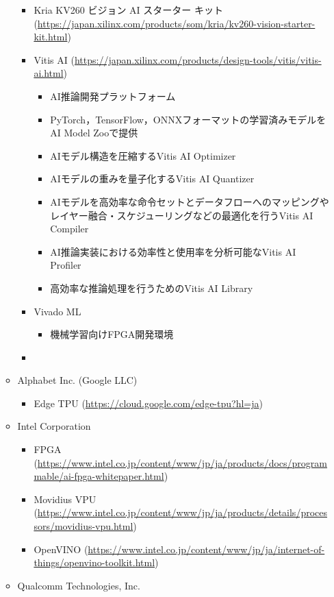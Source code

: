 \begin{itemize}
\begin{itemize}
\begin{itemize}
			\item Kria KV260 ビジョン AI スターター キット (\url{https://japan.xilinx.com/products/som/kria/kv260-vision-starter-kit.html})
			\item Vitis AI (\url{https://japan.xilinx.com/products/design-tools/vitis/vitis-ai.html})
			\begin{itemize}
				\item AI推論開発プラットフォーム
				\item PyTorch，TensorFlow，ONNXフォーマットの学習済みモデルをAI Model Zooで提供
				\item AIモデル構造を圧縮するVitis AI Optimizer
				\item AIモデルの重みを量子化するVitis AI Quantizer
				\item AIモデルを高効率な命令セットとデータフローへのマッピングやレイヤー融合・スケジューリングなどの最適化を行うVitis AI Compiler
				\item AI推論実装における効率性と使用率を分析可能なVitis AI Profiler
				\item 高効率な推論処理を行うためのVitis AI Library
			\end{itemize}
			\item Vivado ML
			\begin{itemize}
				\item 機械学習向けFPGA開発環境
			\end{itemize}
			\item 
		\end{itemize}
		\item Alphabet Inc. (Google LLC)
		\begin{itemize}
			\item Edge TPU (\url{https://cloud.google.com/edge-tpu?hl=ja})
		\end{itemize}
		\item Intel Corporation
		\begin{itemize}
			\item FPGA (\url{https://www.intel.co.jp/content/www/jp/ja/products/docs/programmable/ai-fpga-whitepaper.html})
			\item Movidius VPU (\url{https://www.intel.co.jp/content/www/jp/ja/products/details/processors/movidius-vpu.html})
			\item OpenVINO (\url{https://www.intel.co.jp/content/www/jp/ja/internet-of-things/openvino-toolkit.html})
		\end{itemize}
		\item Qualcomm Technologies, Inc.
		\begin{itemize}

\end{itemize}
\end{itemize}
\end{itemize}
